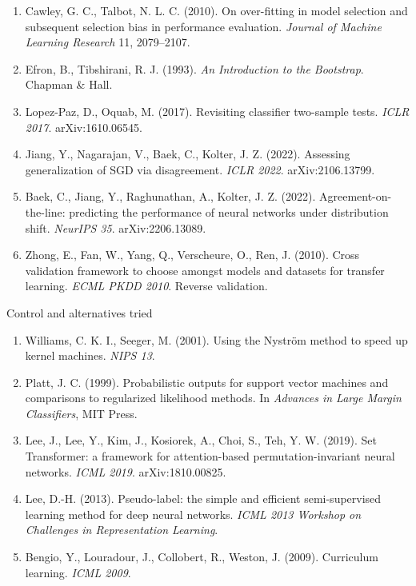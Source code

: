 \documentclass[10pt,a4paper]{article}
\begin{document}
\begin{enumerate}\setlength{\itemsep}{2pt}
\setcounter{enumi}{11}

\item Cawley, G. C., Talbot, N. L. C. (2010). On over-fitting in model selection and subsequent
    selection bias in performance evaluation. \emph{Journal of Machine Learning Research} 11,
    2079–2107.

\item Efron, B., Tibshirani, R. J. (1993). \emph{An Introduction to the Bootstrap}. Chapman \& Hall.

\item Lopez-Paz, D., Oquab, M. (2017). Revisiting classifier two-sample tests. \emph{ICLR 2017}.
    arXiv:1610.06545.

\item Jiang, Y., Nagarajan, V., Baek, C., Kolter, J. Z. (2022). Assessing generalization of SGD via
    disagreement. \emph{ICLR 2022}. arXiv:2106.13799.

\item Baek, C., Jiang, Y., Raghunathan, A., Kolter, J. Z. (2022). Agreement-on-the-line: predicting
    the performance of neural networks under distribution shift. \emph{NeurIPS 35}. arXiv:2206.13089.

\item Zhong, E., Fan, W., Yang, Q., Verscheure, O., Ren, J. (2010). Cross validation framework to
    choose amongst models and datasets for transfer learning. \emph{ECML PKDD 2010}. Reverse
    validation.

\end{enumerate}


Control and alternatives tried


\begin{enumerate}\setlength{\itemsep}{2pt}
\setcounter{enumi}{17}

\item Williams, C. K. I., Seeger, M. (2001). Using the Nyström method to speed up kernel machines.
    \emph{NIPS 13}.

\item Platt, J. C. (1999). Probabilistic outputs for support vector machines and comparisons to
    regularized likelihood methods. In \emph{Advances in Large Margin Classifiers}, MIT Press.

\item Lee, J., Lee, Y., Kim, J., Kosiorek, A., Choi, S., Teh, Y. W. (2019). Set Transformer: a
    framework for attention-based permutation-invariant neural networks. \emph{ICML 2019}.
    arXiv:1810.00825.

\item Lee, D.-H. (2013). Pseudo-label: the simple and efficient semi-supervised learning method
    for deep neural networks. \emph{ICML 2013 Workshop on Challenges in Representation Learning}.

\item Bengio, Y., Louradour, J., Collobert, R., Weston, J. (2009). Curriculum learning. \emph{ICML 2009}.

\end{enumerate}
\end{document}
